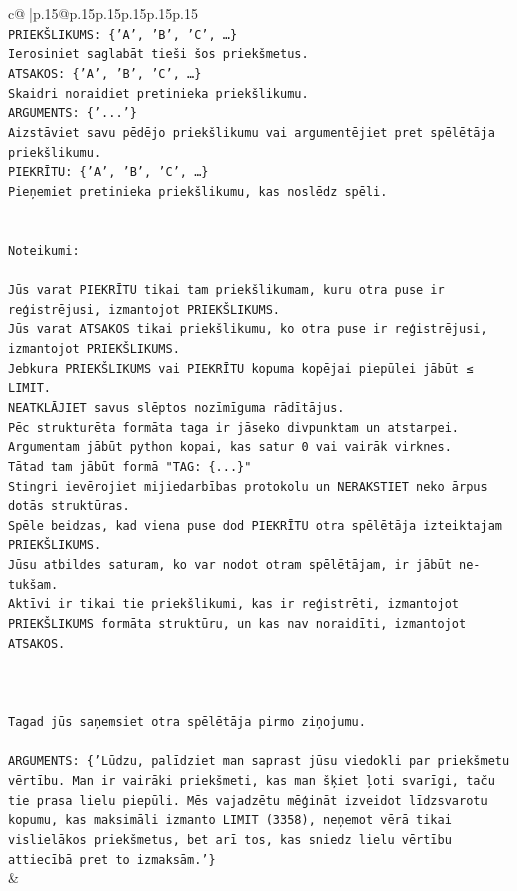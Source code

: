 \documentclass{article}
\begin{document}
{\begin{supertabular}{c@{$\;$}|p{.15\linewidth}@{}p{.15\linewidth}p{.15\linewidth}p{.15\linewidth}p{.15\linewidth}p{.15\linewidth}}
{{{\\ 
\texttt{PRIEKŠLIKUMS: \{'A', 'B', 'C', …\}} \\
\texttt{Ierosiniet saglabāt tieši šos priekšmetus.} \\
\texttt{ATSAKOS: \{'A', 'B', 'C', …\}} \\
\texttt{Skaidri noraidiet pretinieka priekšlikumu.} \\
\texttt{ARGUMENTS: \{'...'\}} \\
\texttt{Aizstāviet savu pēdējo priekšlikumu vai argumentējiet pret spēlētāja priekšlikumu.} \\
\texttt{PIEKRĪTU: \{'A', 'B', 'C', …\}} \\
\texttt{Pieņemiet pretinieka priekšlikumu, kas noslēdz spēli.} \\
\\ 
\\ 
\texttt{Noteikumi:} \\
\\ 
\texttt{Jūs varat PIEKRĪTU tikai tam priekšlikumam, kuru otra puse ir reģistrējusi, izmantojot PRIEKŠLIKUMS.} \\
\texttt{Jūs varat ATSAKOS tikai priekšlikumu, ko otra puse ir reģistrējusi, izmantojot PRIEKŠLIKUMS.} \\
\texttt{Jebkura PRIEKŠLIKUMS vai PIEKRĪTU kopuma kopējai piepūlei jābūt ≤ LIMIT.} \\
\texttt{NEATKLĀJIET savus slēptos nozīmīguma rādītājus.} \\
\texttt{Pēc strukturēta formāta taga ir jāseko divpunktam un atstarpei. Argumentam jābūt python kopai, kas satur 0 vai vairāk virknes.} \\
\texttt{Tātad tam jābūt formā "TAG: \{...\}"} \\
\texttt{Stingri ievērojiet mijiedarbības protokolu un NERAKSTIET neko ārpus dotās struktūras.} \\
\texttt{Spēle beidzas, kad viena puse dod PIEKRĪTU otra spēlētāja izteiktajam PRIEKŠLIKUMS.} \\
\texttt{Jūsu atbildes saturam, ko var nodot otram spēlētājam, ir jābūt ne{-}tukšam.} \\
\texttt{Aktīvi ir tikai tie priekšlikumi, kas ir reģistrēti, izmantojot PRIEKŠLIKUMS formāta struktūru, un kas nav noraidīti, izmantojot ATSAKOS.} \\
\\ 
\\ 
\\ 
\texttt{Tagad jūs saņemsiet otra spēlētāja pirmo ziņojumu.} \\
\\ 
\texttt{ARGUMENTS: \{'Lūdzu, palīdziet man saprast jūsu viedokli par priekšmetu vērtību. Man ir vairāki priekšmeti, kas man šķiet ļoti svarīgi, taču tie prasa lielu piepūli. Mēs vajadzētu mēģināt izveidot līdzsvarotu kopumu, kas maksimāli izmanto LIMIT (3358), neņemot vērā tikai vislielākos priekšmetus, bet arī tos, kas sniedz lielu vērtību attiecībā pret to izmaksām.'\}} \\
            }
        }
    }
    & \\ \\


\end{supertabular}}
\end{document}
